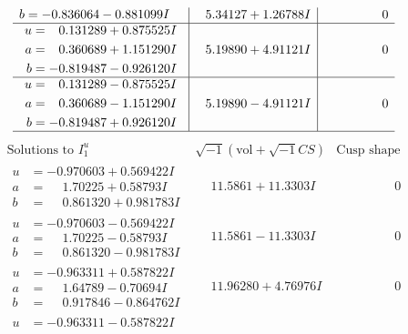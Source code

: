 \documentclass[1p]{elsarticle_modified}
\theoremstyle{definition}
\newcommand{\I}{\sqrt{-1}}
\begin{document}
$$\begin{array}{c|c|c}
\begin{aligned}
b &= -0.836064 - 0.881099 I\end{aligned}
 & \phantom{-}5.34127 + 1.26788 I & \phantom{-0.000000 } 0 \\ \hline\begin{aligned}
u &= \phantom{-}0.131289 + 0.875525 I \\
a &= \phantom{-}0.360689 + 1.151290 I \\
b &= -0.819487 - 0.926120 I\end{aligned}
 & \phantom{-}5.19890 + 4.91121 I & \phantom{-0.000000 } 0 \\ \hline\begin{aligned}
u &= \phantom{-}0.131289 - 0.875525 I \\
a &= \phantom{-}0.360689 - 1.151290 I \\
b &= -0.819487 + 0.926120 I\end{aligned}
 & \phantom{-}5.19890 - 4.91121 I & \phantom{-0.000000 } 0\\
 \hline 
 \end{array}$$\newpage$$\begin{array}{c|c|c}  
\text{Solutions to }I^u_{1}& \I (\text{vol} + \sqrt{-1}CS) & \text{Cusp shape}\\
 \hline 
\begin{aligned}
u &= -0.970603 + 0.569422 I \\
a &= \phantom{-}1.70225 + 0.58793 I \\
b &= \phantom{-}0.861320 + 0.981783 I\end{aligned}
 & \phantom{-}11.5861 + 11.3303 I & \phantom{-0.000000 } 0 \\ \hline\begin{aligned}
u &= -0.970603 - 0.569422 I \\
a &= \phantom{-}1.70225 - 0.58793 I \\
b &= \phantom{-}0.861320 - 0.981783 I\end{aligned}
 & \phantom{-}11.5861 - 11.3303 I & \phantom{-0.000000 } 0 \\ \hline\begin{aligned}
u &= -0.963311 + 0.587822 I \\
a &= \phantom{-}1.64789 - 0.70694 I \\
b &= \phantom{-}0.917846 - 0.864762 I\end{aligned}
 & \phantom{-}11.96280 + 4.76976 I & \phantom{-0.000000 } 0 \\ \hline\begin{aligned}
u &= -0.963311 - 0.587822 I \\

\end{aligned}
\end{array}$$
\end{document}
